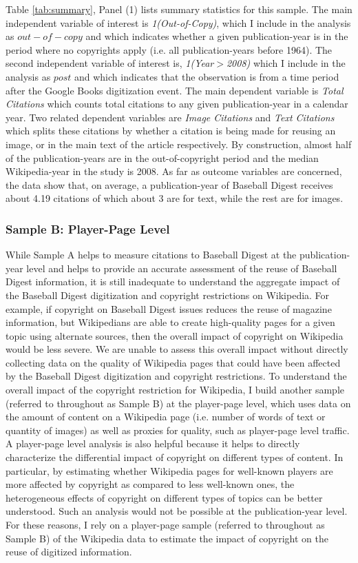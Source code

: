 \documentclass[11pt]{article}
\begin{document}
Table \ref{tab:summary}, Panel (1) lists summary statistics for this sample. The main independent variable of interest is \emph{1(Out-of-Copy)}, which I include in the analysis as $out-of-copy$ and which indicates whether a given publication-year is in the period where no copyrights apply (i.e. all publication-years before 1964). The second independent variable of interest is, \emph{1(Year$>$2008)} which I include in the analysis as $post$ and which indicates that the observation is from a time period after the Google Books digitization event. The main dependent variable is \emph{Total Citations} which counts total citations to any given publication-year in a calendar year. Two related dependent variables are \emph{Image Citations} and \emph{Text Citations} which splits these citations by whether a citation is being made for reusing an image, or in the main text of the article respectively. By construction, almost half of the publication-years are in the out-of-copyright period and the median Wikipedia-year in the study is 2008. As far as outcome variables are concerned, the data show that, on average, a publication-year of Baseball Digest receives about 4.19 citations of which about 3 are for text, while the rest are for images. 

\subsubsection{Sample B: Player-Page Level}

While Sample A helps to measure citations to Baseball Digest at the publication-year level and helps to provide an accurate assessment of the reuse of Baseball Digest information, it is still inadequate to understand the aggregate impact of the Baseball Digest digitization and copyright restrictions on Wikipedia. For example, if copyright on Baseball Digest issues reduces the reuse of magazine information, but Wikipedians are able to create high-quality pages for a given topic using alternate sources, then the overall impact of copyright on Wikipedia would be less severe. We are unable to assess this overall impact without directly collecting data on the quality of Wikipedia pages that could have been affected by the Baseball Digest digitization and copyright restrictions. To understand the overall impact of the copyright restriction for Wikipedia, I build another sample (referred to throughout as Sample B) at the player-page level, which uses data on the amount of content on a Wikipedia page (i.e. number of words of text or quantity of images) as well as proxies for quality, such as player-page level traffic. A player-page level analysis is also helpful because it helps to directly characterize the differential impact of copyright on different types of content. In particular, by estimating whether Wikipedia pages for well-known players are more affected by copyright as compared to less well-known ones, the heterogeneous effects of copyright on different types of topics can be better understood. Such an analysis would not be possible at the publication-year level.  For these reasons, I rely on a player-page sample (referred to throughout as Sample B) of the Wikipedia data to estimate the impact of copyright on the reuse of digitized information.
\end{document}
